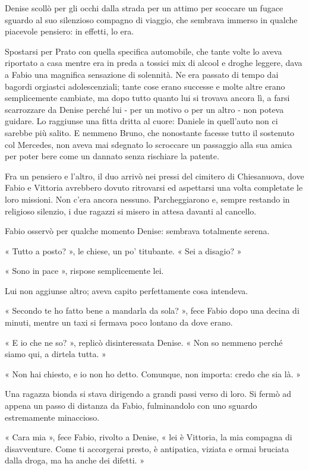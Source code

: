 Denise scollò per gli occhi dalla strada per un attimo per scoccare un fugace sguardo al suo silenzioso compagno di viaggio, che sembrava immerso in qualche piacevole pensiero: in effetti, lo era.

Spostarsi per Prato con quella specifica automobile, che tante volte lo aveva riportato a casa mentre era in preda a tossici mix di alcool e droghe leggere, dava a Fabio una magnifica sensazione di solennità. Ne era passato di tempo dai bagordi orgiastci adolescenziali; tante cose erano successe e molte altre erano semplicemente cambiate, ma dopo tutto quanto lui si trovava ancora lì, a farsi scarrozzare da Denise perché lui - per un motivo o per un altro - non poteva guidare. Lo raggiunse una fitta dritta al cuore: Daniele in quell'auto non ci sarebbe più salito. E nemmeno Bruno, che nonostante facesse tutto il sostenuto col Mercedes, non aveva mai sdegnato lo scroccare un passaggio alla sua amica per poter bere come un dannato senza rischiare la patente.

Fra un pensiero e l'altro, il duo arrivò nei pressi del cimitero di Chiesanuova, dove Fabio e Vittoria avrebbero dovuto ritrovarsi ed aspettarsi una volta completate le loro missioni. Non c'era ancora nessuno. Parcheggiarono e, sempre restando in religioso silenzio, i due ragazzi si misero in attesa davanti al cancello.

Fabio osservò per qualche momento Denise: sembrava totalmente serena.

« Tutto a posto? », le chiese, un po' titubante. « Sei a disagio? »

« Sono in pace », rispose semplicemente lei.

Lui non aggiunse altro; aveva capito perfettamente cosa intendeva.

« Secondo te ho fatto bene a mandarla da sola? », fece Fabio dopo una decina di minuti, mentre un taxi si fermava poco lontano da dove erano.

« E io che ne so? », replicò disinteressata Denise. « Non so nemmeno perché siamo qui, a dirtela tutta. »

« Non hai chiesto, e io non ho detto. Comunque, non importa: credo che sia là. »

Una ragazza bionda si stava dirigendo a grandi passi verso di loro. Si fermò ad appena un passo di distanza da Fabio, fulminandolo con uno sguardo estremamente minaccioso.

« Cara mia », fece Fabio, rivolto a Denise, « lei è Vittoria, la mia compagna di disavventure. Come ti accorgerai presto, è antipatica, viziata e ormai bruciata dalla droga, ma ha anche dei difetti. »

